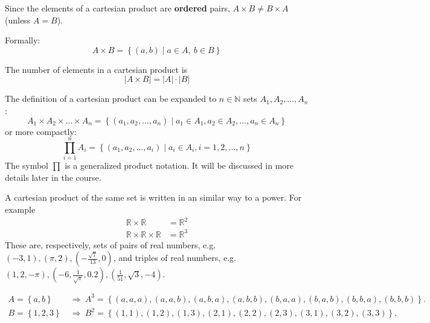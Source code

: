\begin{warning}
  Since the elements of a cartesian product are \textbf{ordered} pairs, $A\times B\neq B\times A$ (unless $A=B$).
\end{warning}

Formally:
\begin{equation*}
  A\times B = \left\{ \left( a,b \right) \mid a\in A,\	b\in B \right\}
\end{equation*}

The number of elements in a cartesian product is
\begin{equation*}
  \left|A\times B\right| = |A|\cdot|B|
\end{equation*}

The definition of a cartesian product can be expanded to $n\in\mathbb{N}$ sets $A_{1}, A_{2}, \dots, A_{n}$:
\begin{equation*}
  A_{1}\times A_{2} \times \dots \times A_{n} = \left\{ \left(a_{1}, a_{2}, \dots, a_{n}\right) \mid a_{1}\in A_{1}, a_{2}\in A_{2}, \dots, a_{n}\in A_{n} \right\}
\end{equation*}
or more compactly:
\begin{equation*}
  \prod\limits_{i=1}^{n} A_{i} = \left\{ \left( a_{1}, a_{2}, \dots, a_{i} \right) \mid a_{i}\in A_{i}, i=1,2,\dots,n\right\}
\end{equation*}
The symbol $\prod$ is a generalized product notation. It will be discussed in more details later in the course.

A cartesian product of the same set is written in an similar way to a power. For example
\begin{align*}
  \mathbb{R}\times\mathbb{R} &= \mathbb{R}^{2}\\
  \mathbb{R}\times\mathbb{R}\times\mathbb{R} &= \mathbb{R}^{3}
\end{align*}
These are, respectively, sets of pairs of real numbers, e.g. $\left( -3,1 \right), (\pi,2), (-\frac{\sqrt{7}}{13}, 0)$, and triples of real numbers, e.g. $\left( 1,2,-\pi \right), \left( -6,\frac{1}{\sqrt{\pi}}, 0.2 \right), \left( \frac{1}{51}, \sqrt{3}, -4 \right)$.

\begin{example}
  \begin{align*}
  A=\left\{ a,b \right\}\ &\Rightarrow\ A^{3}=\left\{\left( a,a,a \right), \left( a,a,b \right), \left( a,b,a \right), \left( a,b,b \right), \left( b,a,a \right), \left( b,a,b \right), \left( b,b,a \right), \left( b,b,b \right)\right\}.\\
  B=\left\{ 1,2,3 \right\}\ &\Rightarrow\ B^{2}=\left\{\left( 1,1 \right), \left( 1,2 \right), \left( 1,3\right), \left( 2,1 \right), \left( 2,2 \right), \left( 2,3 \right), \left( 3,1 \right),\left( 3,2 \right), \left( 3,3 \right)\right\}.
  \end{align*}
\end{example}

